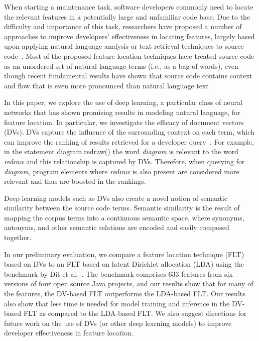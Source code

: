 
% 
%
When starting a maintenance task, software developers commonly need to
locate the relevant features in a potentially large and unfamiliar
code base. Due to the difficulty and importance of this task,
researchers have proposed a number of approaches to improve
developers' effectiveness in locating features, largely based upon
applying natural language analysis or text retrieval techniques to source
code~\cite{dit_feature_2013}. Most of the proposed feature location
techniques have treated source code as an unordered set of natural
language terms (i.e., as a bag-of-words), even though recent fundamental
results have shown that source code contains context and flow that is
even more pronounced than natural language
text~\cite{hindle_naturalness_2012}.


%
%
In this paper, we explore the use of deep learning, a particular class of neural networks that has shown promising
results in modeling natural language, for feature location. In
particular, we investigate the efficacy of document
vectors~\cite{le_distributed_2014} (DVs). DVs capture the
influence of the surrounding context on each term, which can improve the ranking
of results retrieved for a developer query~\cite{Hill-etal_2014}. For example, in the
statement {\sf diagram.redraw()} the word {\em diagram} is relevant to the word
{\em redraw} and this relationship is captured by DVs. Therefore, when querying for {\em diagram}, program elements
where {\em redraw} is also present are considered more relevant and thus are boosted in the rankings.

Deep learning models such as DVs also create a novel notion
of semantic similarity between the source code terms. Semantic
similarity is the result of mapping the corpus terms into a continuous
semantic space, where synonyms, antonyms, and other semantic relations
are encoded and easily composed together.


%
%

In our preliminary evaluation, we compare a feature location technique (FLT) based on DVs to an FLT based on latent Dirichlet allocation (LDA) using the benchmark by Dit et al.~\cite{Dit-etal_2013}.
The benchmark comprises 633 features from six versions of four open source Java projects, and our results show that for many of the features, the DV-based FLT outperforms the LDA-based FLT.
Our results also show that less time is needed for model training and inference in the DV-based FLT as compared to the LDA-based FLT.
We also suggest directions for future work on the use
of DVs (or other deep learning models) to improve developer effectiveness in feature location.



